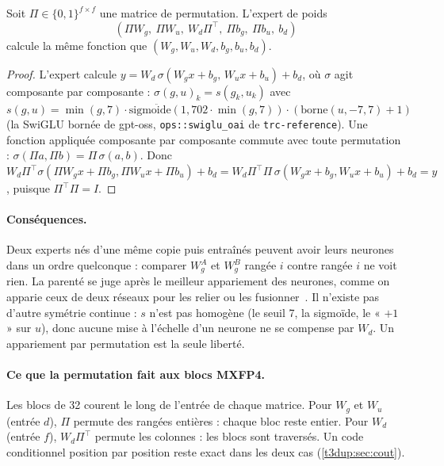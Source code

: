 \begin{proposition}\label{t3dup:prop:permutation}
Soit $\Pi \in \{0,1\}^{f \times f}$ une matrice de permutation. L'expert de poids
\[ (\Pi W_g,\ \Pi W_u,\ W_d \Pi^\top,\ \Pi b_g,\ \Pi b_u,\ b_d) \]
calcule la même fonction que $(W_g, W_u, W_d, b_g, b_u, b_d)$.
\end{proposition}

\begin{proof}
L'expert calcule $y = W_d\, \sigma(W_g x + b_g,\, W_u x + b_u) + b_d$, où $\sigma$ agit composante par composante : $\sigma(g, u)_k = s(g_k, u_k)$ avec $s(g, u) = \min(g, 7)\cdot\mathrm{sigmo\ddot ide}(1{,}702\cdot\min(g, 7))\cdot(\mathrm{borne}(u, -7, 7) + 1)$ (la SwiGLU bornée de gpt-oss, \texttt{ops::swiglu\_oai} de \texttt{trc-reference}). Une fonction appliquée composante par composante commute avec toute permutation : $\sigma(\Pi a, \Pi b) = \Pi\,\sigma(a, b)$. Donc $W_d \Pi^\top \sigma(\Pi W_g x + \Pi b_g, \Pi W_u x + \Pi b_u) + b_d = W_d \Pi^\top \Pi\, \sigma(W_g x + b_g, W_u x + b_u) + b_d = y$, puisque $\Pi^\top \Pi = I$.
\end{proof}

\paragraph{Conséquences.} Deux experts nés d'une même copie puis entraînés peuvent avoir leurs neurones dans un ordre quelconque : comparer $W_g^A$ et $W_g^B$ rangée $i$ contre rangée $i$ ne voit rien. La parenté se juge après le meilleur appariement des neurones, comme on apparie ceux de deux réseaux pour les relier ou les fusionner~\cite{ainsworth2022rebasin,entezari2021permutation}. Il n'existe pas d'autre symétrie continue : $s$ n'est pas homogène (le seuil 7, la sigmoïde, le « $+1$ » sur $u$), donc aucune mise à l'échelle d'un neurone ne se compense par $W_d$. Un appariement par permutation est la seule liberté.

\paragraph{Ce que la permutation fait aux blocs MXFP4.} Les blocs de 32 courent le long de l'entrée de chaque matrice. Pour $W_g$ et $W_u$ (entrée $d$), $\Pi$ permute des rangées entières : chaque bloc reste entier. Pour $W_d$ (entrée $f$), $W_d \Pi^\top$ permute les colonnes : les blocs sont traversés. Un code conditionnel position par position reste exact dans les deux cas (\cref{t3dup:sec:cout}).

